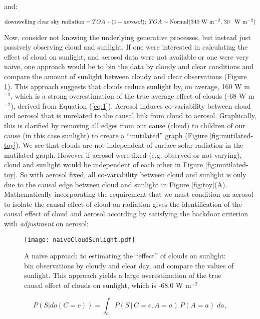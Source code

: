 \documentclass[12pt]{article}
\begin{document}
and:

\begin{equation*}
  \text{downwelling clear sky radiation} = TOA \, \cdot \, (1 - aerosol); \;
  TOA \sim \text{Normal(340 W m$^{-2}$, 30 \, W m$^{-2}$)}
\end{equation*}

Now, consider not knowing the underlying generative processes, but
instead just passively observing cloud and sunlight. If one were
interested in calculating the effect of cloud on sunlight, and aerosol
data were not available or one were very naive, one approach would be
to bin the data by cloudy and clear conditions and compare the amount
of sunlight between cloudy and clear observations (Figure
\ref{fig:naive-cloud-sunlight}). This approach suggests that clouds
reduce sunlight by, on average, 160 W m$^{-2}$, which is a strong
overestimation of the true average effect of clouds (-68 W m$^{-2}$),
derived from Equation (\ref{eq:1}). Aerosol induces co-variability
between cloud and aerosol that is unrelated to the causal link from
cloud to aerosol. Graphically, this is clarified by removing all edges
from our cause (cloud) to children of our cause (in this case
sunlight) to create a ``mutilated'' graph (Figure
\ref{fig:mutilated-toy}). We see that clouds are not independent of
surface solar radiation in the mutilated graph.  However if aerosol
were fixed (e.g. observed or not varying), cloud and sunlight would be
independent of each other in Figure \ref{fig:mutilated-toy}. So with
aerosol fixed, all co-variability between cloud and sunlight is only
due to the causal edge between cloud and sunlight in Figure
\ref{fig:toy}(A).  Mathematically incorporating the requirement that
we must condition on aerosol to isolate the causal effect of cloud on
radiation gives the identification of the causal effect of cloud and
aerosol according by satisfying the backdoor criterion with
\textit{adjustment} on aerosol:

\begin{figure}
  \texttt{[image: naiveCloudSunlight.pdf]}
  \caption{A naive approach to estimating the ``effect'' of clouds on
    sunlight: bin observations by cloudy and clear day, and compare
    the values of sunlight. This approach yields a large
    overestimation of the true causal effect of clouds on sunlight,
    which is -68.0 W m$^{-2}$}
  \label{fig:naive-cloud-sunlight}
\end{figure}

\begin{equation}
  P(S | do(C = c)) = \int_{a} P(S \, | \, C = c,
  A=a) \, P(A=a) \; da,
  \label{eq:3}
\end{equation}
\end{document}
